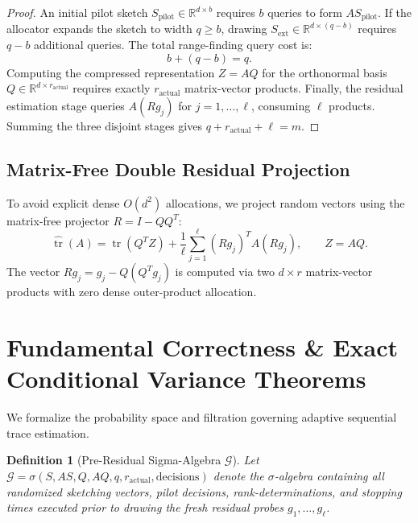 \documentclass[11pt,letterpaper]{article}
\newtheorem{definition}[theorem]{Definition}
\begin{document}
\begin{proof}
An initial pilot sketch $S_{\text{pilot}} \in \mathbb{R}^{d \times b}$ requires $b$ queries to form $AS_{\text{pilot}}$. If the allocator expands the sketch to width $q \ge b$, drawing $S_{\text{ext}} \in \mathbb{R}^{d \times (q-b)}$ requires $q - b$ additional queries. The total range-finding query cost is:
\begin{equation}
b + (q - b) = q.
\end{equation}
Computing the compressed representation $Z = AQ$ for the orthonormal basis $Q \in \mathbb{R}^{d \times r_{\text{actual}}}$ requires exactly $r_{\text{actual}}$ matrix-vector products. Finally, the residual estimation stage queries $A(Rg_j)$ for $j = 1, \dots, \ell$, consuming $\ell$ products. Summing the three disjoint stages gives $q + r_{\text{actual}} + \ell = m$.
\end{proof}

\subsection{Matrix-Free Double Residual Projection}
To avoid explicit dense $O(d^2)$ allocations, we project random vectors using the matrix-free projector $R = I - QQ^T$:
\begin{equation}
\widehat{\operatorname{tr}}(A) = \operatorname{tr}(Q^T Z) + \frac{1}{\ell} \sum_{j=1}^\ell (Rg_j)^T A (Rg_j), \qquad Z = AQ.
\end{equation}
The vector $Rg_j = g_j - Q(Q^T g_j)$ is computed via two $d \times r$ matrix-vector products with zero dense outer-product allocation.

\newpage

\section{Fundamental Correctness \& Exact Conditional Variance Theorems}

We formalize the probability space and filtration governing adaptive sequential trace estimation.

\begin{definition}[Pre-Residual Sigma-Algebra $\mathcal{G}$]
Let $\mathcal{G} = \sigma(S, AS, Q, AQ, q, r_{\text{actual}}, \text{decisions})$ denote the $\sigma$-algebra containing all randomized sketching vectors, pilot decisions, rank-determinations, and stopping times executed prior to drawing the fresh residual probes $g_1, \dots, g_\ell$.
\end{definition}
\end{document}
